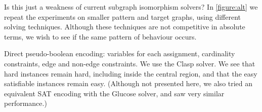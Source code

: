 \documentclass[letterpaper]{article}
\begin{document}
\begin{figure*}[t]
    
    \caption{Behaviour of other solvers on the induced variant on smaller graphs, shown in the style of
        \cref{figure:non-induced}. The second row shows the number of search nodes used by the Glasgow
        algorithm, the third row shows the number of decisions made by the Clasp pseudo-boolean solver,
        the fourth row shows the number of search nodes used by a clique encoding, and the fifth a mixed
        integer encoding with Gurobi.}\label{figure:alt}
\end{figure*}

Is this just a weakness of current subgraph isomorphism solvers? In \cref{figure:alt} we repeat the
experiments on smaller pattern and target graphs, using different solving techniques. Although these
techniques are not competitive in absolute terms, we wish to see if the same pattern of behaviour
occurs.

Direct pseudo-boolean encoding: variables for each assignment, cardinality constraints, edge and
non-edge constraints. We use the Clasp solver. We see that hard instances remain hard, including
inside the central region, and that the easy satisfiable instances remain easy. (Although not
presented here, we also tried an equivalent SAT encoding with the Glucose solver, and saw very
similar performance.)
\end{document}
